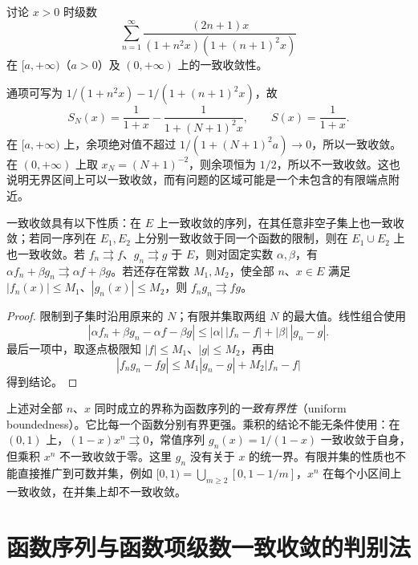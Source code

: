\begin{example}
\label{ex:uniform-telescoping-rational-series}
讨论 $x>0$ 时级数
\[
    \sum_{n=1}^\infty
    \frac{(2n+1)x}{(1+n^2x)(1+(n+1)^2x)}
\]
在 $[a,+\infty)$（$a>0$）及 $(0,+\infty)$ 上的一致收敛性。
\end{example}

\begin{solve}
通项可写为 $1/(1+n^2x)-1/(1+(n+1)^2x)$，故
\[
    S_N(x)=\frac1{1+x}-\frac1{1+(N+1)^2x},\qquad
    S(x)=\frac1{1+x}.
\]
在 $[a,+\infty)$ 上，余项绝对值不超过 $1/(1+(N+1)^2a)\to0$，所以一致收敛。在 $(0,+\infty)$ 上取 $x_N=(N+1)^{-2}$，则余项恒为 $1/2$，所以不一致收敛。这也说明无界区间上可以一致收敛，而有问题的区域可能是一个未包含的有限端点附近。
\end{solve}

\begin{proposition}
\label{prop:elementary-uniform-convergence-properties}
一致收敛具有以下性质：在 $E$ 上一致收敛的序列，在其任意非空子集上也一致收敛；若同一序列在 $E_1,E_2$ 上分别一致收敛于同一个函数的限制，则在 $E_1\cup E_2$ 上也一致收敛。若 $f_n\rightrightarrows f$、$g_n\rightrightarrows g$ 于 $E$，则对固定实数 $\alpha,\beta$，有 $\alpha f_n+\beta g_n\rightrightarrows\alpha f+\beta g$。若还存在常数 $M_1,M_2$，使全部 $n$、$x\in E$ 满足 $|f_n(x)|\leq M_1$、$|g_n(x)|\leq M_2$，则 $f_ng_n\rightrightarrows fg$。
\end{proposition}

\begin{proof}
限制到子集时沿用原来的 $N$；有限并集取两组 $N$ 的最大值。线性组合使用
\[
    |\alpha f_n+\beta g_n-\alpha f-\beta g|
    \leq|\alpha|\,|f_n-f|+|\beta|\,|g_n-g|.
\]
最后一项中，取逐点极限知 $|f|\leq M_1$、$|g|\leq M_2$，再由
\[
    |f_ng_n-fg|\leq M_1|g_n-g|+M_2|f_n-f|
\]
得到结论。
\end{proof}

上述对全部 $n$、$x$ 同时成立的界称为函数序列的\emph{一致有界性}（uniform boundedness）。它比每一个函数分别有界更强。乘积的结论不能无条件使用：在 $(0,1)$ 上，$(1-x)x^n\rightrightarrows0$，常值序列 $g_n(x)=1/(1-x)$ 一致收敛于自身，但乘积 $x^n$ 不一致收敛于零。这里 $g_n$ 没有关于 $x$ 的统一界。有限并集的性质也不能直接推广到可数并集，例如 $[0,1)=\bigcup_{m\geq2}[0,1-1/m]$，$x^n$ 在每个小区间上一致收敛，在并集上却不一致收敛。

\section{函数序列与函数项级数一致收敛的判别法}
\label{sec:uniform-convergence-tests}

